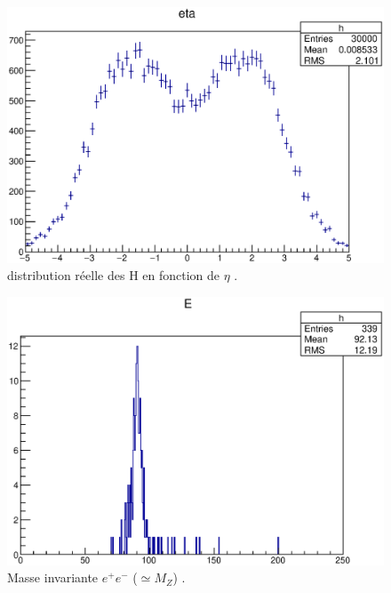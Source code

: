 \documentclass[11pt]{article} %
\begin{document}
\begin{figure}[h!]
  \caption{distribution réelle des H en fonction de $\eta$ .}
\includegraphics{../graphes/eta_gammagamma_true}
\end{figure}


\begin{figure}[h!]
  \caption{Masse invariante $e^+ e^-$ ($\simeq M_Z$) .}
\includegraphics{../graphes/distrib_mee}
\end{figure}
\end{document}
